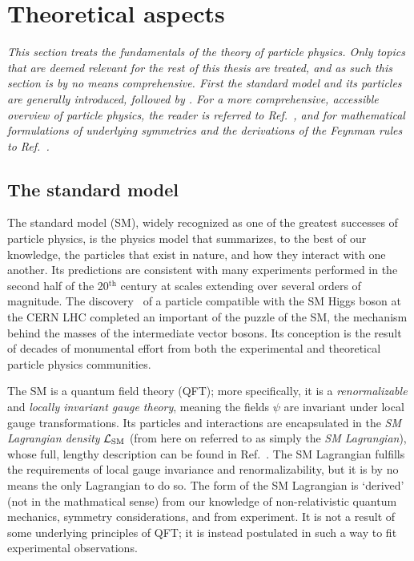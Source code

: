\section{Theoretical aspects}

\emph{%
% 
This section treats the fundamentals of the theory of particle physics.
% 
Only topics that are deemed relevant for the rest of this thesis are treated, and as such this section is by no means comprehensive.
%
First the standard model and its particles are generally introduced, followed by .
% 
For a more comprehensive, accessible overview of particle physics, the reader is referred to Ref.~\cite{griffiths}, and for mathematical formulations of underlying symmetries and the derivations of the Feynman rules to Ref.~\cite{peskin}.
}

\subsection{The standard model}

The standard model (SM), widely recognized as one of the greatest successes of particle physics, is the physics model that summarizes, to the best of our knowledge, the particles that exist in nature, and how they interact with one another.
% 
Its predictions are consistent with many experiments performed in the second half of the 20${}^\text{th}$ century at scales extending over several orders of magnitude.
% 
The discovery~\cite{Aad:2012tfa,Chatrchyan:2012xdj,Chatrchyan:2013lba} of a particle compatible with the SM Higgs boson at the CERN LHC completed an important of the puzzle of the SM, the mechanism behind the masses of the intermediate vector bosons.
% 
Its conception is the result of decades of monumental effort from both the experimental and theoretical particle physics communities.


The SM is a quantum field theory (QFT); more specifically, it is a \textit{renormalizable} and \textit{locally invariant gauge theory}, meaning the fields $\psi$ are invariant under local gauge transformations.
% 
Its particles and interactions are encapsulated in the \textit{SM Lagrangian density} $\mathcal{L}_\text{SM}$ (from here on referred to as simply the \textit{SM Lagrangian}), whose full, lengthy description can be found in Ref.~\cite{todo}.
% 
The SM Lagrangian fulfills the requirements of local gauge invariance and renormalizability, but it is by no means the only Lagrangian to do so.
% 
The form of the SM Lagrangian is `derived' (not in the mathmatical sense) from our knowledge of non-relativistic quantum mechanics, symmetry considerations, and from experiment.
% 
It is not a result of some underlying principles of QFT; it is instead postulated in such a way to fit experimental observations.


